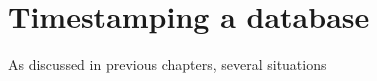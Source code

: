 \section{Timestamping a database}
\label{timestamping-db}


As discussed in previous chapters, several situations 